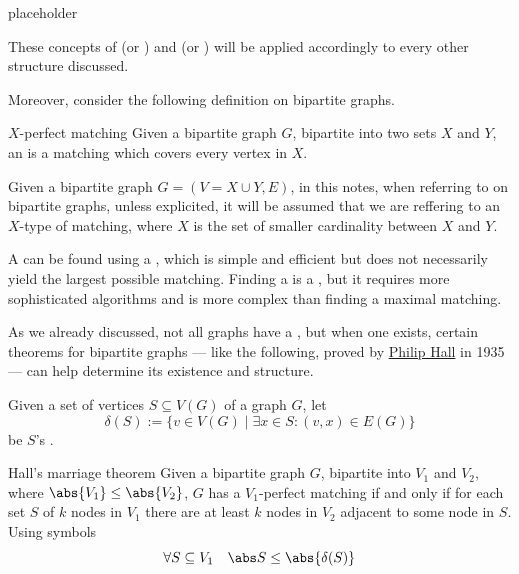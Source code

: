 \documentclass[a4paper, 12pt]{report}
\begin{document}
    \begin{example}
        placeholder 
    \end{example}

    These concepts of  (or ) and  (or ) will be applied accordingly to every other structure discussed.

    Moreover, consider the following definition on bipartite graphs.

    \begin{frameddefn}{$X$-perfect matching}
        Given a bipartite graph $G$, bipartite into two sets $X$ and $Y$, an  is a matching which covers every vertex in $X$.
    \end{frameddefn}

    Given a bipartite graph $G=(V = X \cup Y, E)$, in this notes, when referring to  on bipartite graphs, unless explicited, it will be assumed that we are reffering to an $X$-type of matching, where $X$ is the set of smaller cardinality between $X$ and $Y$.

    A  can be found using a , which is simple and efficient but does not necessarily yield the largest possible matching. Finding a  is a , but it requires more sophisticated algorithms and is more complex than finding a maximal matching.

    As we already discussed, not all graphs have a , but when one exists, certain theorems for bipartite graphs --- like the following, proved by \href{https://en.wikipedia.org/wiki/Philip_Hall}{Philip Hall} in 1935 --- can help determine its existence and structure.

    Given a set of vertices $S \subseteq V(G)$ of a graph $G$, let $$\delta(S) := \{v \in V(G) \mid \exists x \in S : (v, x) \in E(G)\}$$ be $S$'s .

    \begin{framedthm}{Hall's marriage theorem}
        Given a bipartite graph $G$, bipartite into $V_1$ and $V_2$, where $\abs{V_1} \le \abs{V_2}$, $G$ has a $V_1$-perfect matching if and only if for each set $S$ of $k$ nodes in $V_1$ there are at least $k$ nodes in $V_2$ adjacent to some node in $S$. Using symbols $$\forall S \subseteq V_1 \quad \abs S \le \abs{\delta(S)}$$
    \end{framedthm}
\end{document}
